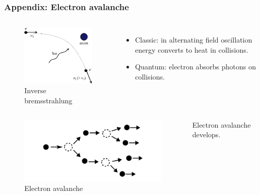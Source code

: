 \documentclass{beamer}
\begin{document}
	\begin{frame}
		\frametitle{Appendix: Electron avalanche}
		
		\begin{columns}
			\begin{figure}
				\centering
				\includegraphics[width=0.7\linewidth]{res/inverse_bremsstrahlung.png}
				\caption*{Inverse bremsstrahlung}
			\end{figure}
			\begin{itemize}
				\item Classic: in alternating field oscillation energy converts to heat in collisions.
				\item Quantum: electron absorbs photons on collisions.
			\end{itemize}
		\end{columns}
		\begin{columns}
			\column{0.5\linewidth}
			\begin{figure}
				\centering
				\includegraphics[width=0.8\linewidth]{res/electron_avalanche.png}
				\caption*{Electron avalanche}
			\end{figure}
			
			\column{0.5\linewidth}
			Electron avalanche develops.
			
		\end{columns}		
		

\end{frame}
\end{document}
